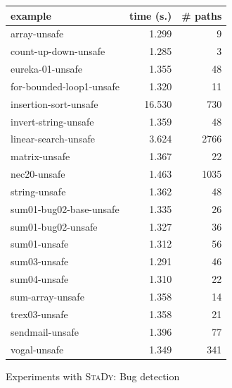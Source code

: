 \begin{figure}[tb]\scriptsize
  \begin{center}
    \begin{tabular}{lrr}
      \hline
      example & time (s.) & \# paths \\ \hline
      array-unsafe & 1.299 & 9 \\ \hline
      count-up-down-unsafe & 1.285 & 3 \\ \hline
      eureka-01-unsafe & 1.355 & 48 \\ \hline
      for-bounded-loop1-unsafe & 1.320 & 11 \\ \hline
      insertion-sort-unsafe & 16.530 & 730 \\ \hline
      invert-string-unsafe & 1.359 & 48 \\ \hline
      linear-search-unsafe & 3.624 & 2766 \\ \hline
      matrix-unsafe & 1.367 & 22 \\ \hline
      nec20-unsafe & 1.463 & 1035 \\ \hline
      string-unsafe & 1.362 & 48 \\ \hline
      sum01-bug02-base-unsafe & 1.335 & 26 \\ \hline
      sum01-bug02-unsafe & 1.327 & 36 \\ \hline
      sum01-unsafe & 1.312 & 56 \\ \hline
      sum03-unsafe & 1.291 & 46 \\ \hline
      sum04-unsafe & 1.310 & 22 \\ \hline
      sum-array-unsafe & 1.358 & 14 \\ \hline
      trex03-unsafe & 1.358 & 21 \\ \hline
      sendmail-unsafe & 1.396 & 77 \\ \hline
      vogal-unsafe & 1.349 & 341 \\ \hline
    \end{tabular}
  \end{center}
  \vspace{-3mm}
  \caption{Experiments with \textsc{StaDy}: Bug detection}    
  \label{fig:scam-experiments1}
  \vspace{-3mm}
\end{figure}

